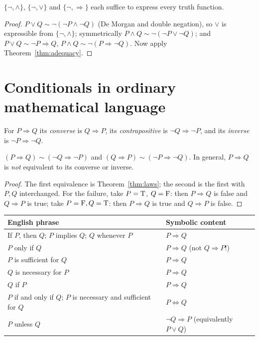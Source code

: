 \begin{corollary}
	$\{\neg,\wedge\}$, $\{\neg,\vee\}$ and $\{\neg,\Rightarrow\}$ each suffice to express every truth function.
\end{corollary}
\begin{proof}
	$P\vee Q\sim\neg(\neg P\wedge\neg Q)$ (De Morgan and double negation), so $\vee$ is expressible from $\{\neg,\wedge\}$; symmetrically $P\wedge Q\sim\neg(\neg P\vee\neg Q)$; and $P\vee Q\sim\neg P\Rightarrow Q$, $P\wedge Q\sim\neg(P\Rightarrow\neg Q)$. Now apply Theorem~\ref{thm:adequacy}.
\end{proof}

\section{Conditionals in ordinary mathematical language}

\begin{definition}
	For $P\Rightarrow Q$ its \emph{converse} is $Q\Rightarrow P$, its \emph{contrapositive} is $\neg Q\Rightarrow\neg P$, and its \emph{inverse} is $\neg P\Rightarrow\neg Q$.
\end{definition}

\begin{proposition}
	$(P\Rightarrow Q)\sim(\neg Q\Rightarrow\neg P)$ and $(Q\Rightarrow P)\sim(\neg P\Rightarrow\neg Q)$. In general, $P\Rightarrow Q$ is \emph{not} equivalent to its converse or inverse.
\end{proposition}
\begin{proof}
	The first equivalence is Theorem~\ref{thm:laws}; the second is the first with $P,Q$ interchanged. For the failure, take $P=\mathrm{T}$, $Q=\mathrm{F}$: then $P\Rightarrow Q$ is false and $Q\Rightarrow P$ is true; take $P=\mathrm{F},Q=\mathrm{T}$: then $P\Rightarrow Q$ is true and $Q\Rightarrow P$ is false.
\end{proof}

\begin{center}
	\begin{tabular}{@{}p{6.2cm}p{8.6cm}@{}}
		\toprule
		\textbf{English phrase} & \textbf{Symbolic content}\\
		\midrule
		If $P$, then $Q$; $P$ implies $Q$; $Q$ whenever $P$ & $P\Rightarrow Q$\\
		$P$ only if $Q$ & $P\Rightarrow Q$ \quad(not $Q\Rightarrow P$!)\\
		$P$ is sufficient for $Q$ & $P\Rightarrow Q$\\
		$Q$ is necessary for $P$ & $P\Rightarrow Q$\\
		$Q$ if $P$ & $P\Rightarrow Q$\\
		$P$ if and only if $Q$; $P$ is necessary and sufficient for $Q$ & $P\Leftrightarrow Q$\\
		$P$ unless $Q$ & $\neg Q\Rightarrow P$ (equivalently $P\vee Q$)\\
		\bottomrule
	\end{tabular}
\end{center}

